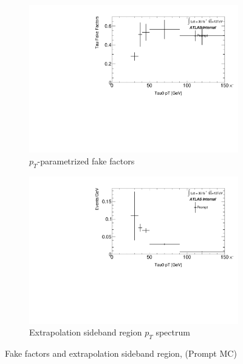 \documentclass[11pt]{article}
\begin{document}
	\begin{figure}[H]
	\centering
	\begin{subfigure}{.5\textwidth}
	\centering
	\includegraphics[width=0.95\linewidth]{figures/FakesEstimate_data_pp8_nonallhad_new_scaledHists/FF_Faketau_Prompt.pdf}
  	\caption{$p_T$-parametrized fake factors}
  	\label{fig:sub1}
	\end{subfigure}%
	\begin{subfigure}{.5\textwidth}
	\centering
	\includegraphics[width=0.95\linewidth]{figures/FakesEstimate_data_pp8_nonallhad_new_scaledHists/hist_Extrapolation_Prompt.pdf}
	\caption{Extrapolation sideband region $p_T$ spectrum}
	\end{subfigure}
	\caption{Fake factors and extrapolation sideband region, (Prompt MC)}
	\end{figure}
\end{document}
